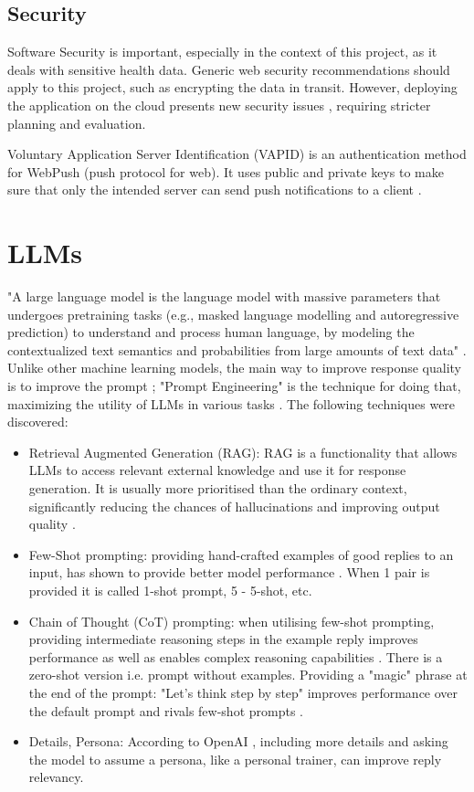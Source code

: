 \subsection{Security}
Software Security is important, especially in the context of this project, as it deals with sensitive health data. Generic web security recommendations should apply to this project, such as encrypting the data in transit. However, deploying the application on the cloud presents new security issues \cite{Zissis2012Addressing}, requiring stricter planning and evaluation.

Voluntary Application Server Identification (VAPID) is an authentication method for WebPush (push protocol for web). It uses public and private keys to make sure that only the intended server can send push notifications to a client \cite{vapid}.
\section{LLMs}
"A large language model is the language model with massive
parameters that undergoes pretraining tasks (e.g., masked
language modelling and autoregressive prediction) to understand and process human language, by modeling the
contextualized text semantics and probabilities from large
amounts of text data" \cite{Yao2023ASO}.
Unlike other machine learning models, the main way to improve response quality is to improve the prompt \cite{Liu2021PretrainPA}; "Prompt Engineering" is the technique for doing that, maximizing the utility of LLMs in various tasks \cite{zhou2023large}. The following techniques were discovered:
\begin{itemize}
   \item Retrieval Augmented Generation (RAG): RAG is a functionality that allows LLMs to access relevant external knowledge and use it for response generation. It is usually more prioritised than the ordinary context, significantly reducing the chances of hallucinations and improving output quality \cite{gao2024retrievalaugmented}.
   \item Few-Shot prompting:  providing hand-crafted examples of good replies to an input, has shown to provide better model performance \cite{brown2020language, min2022rethinking}. When 1 pair is provided it is called 1-shot prompt, 5 - 5-shot, etc. 
   \item Chain of Thought (CoT) prompting: when utilising few-shot prompting, providing intermediate reasoning steps in the example reply improves performance as well as enables complex reasoning capabilities \cite{wei2023chainofthought}. There is a zero-shot version i.e. prompt without examples. Providing a "magic" phrase at the end of the prompt: "Let's think step by step" improves performance over the default prompt and rivals few-shot prompts \cite{kojima2023large}.
   \item Details, Persona: According to OpenAI \cite{openAI}, including more details and asking the model to assume a persona, like a personal trainer, can improve reply relevancy. 
\end{itemize}
